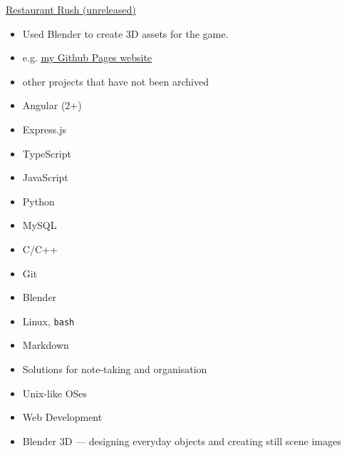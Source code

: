 \documentclass[10pt,a4paper,ragged2e,withhyper]{altacv}
\begin{document}
\begin{paracol}{2}
\divider

\switchcolumn

\vspace{32pt}

\divider

\small\href{https://github.com/Qarian/Restaurant-rush}{Restaurant Rush (unreleased)}
\smallskip

\begin{itemize}
    \item Used Blender to create 3D assets for the game.
\end{itemize}

\divider

\begin{itemize}
    \item e.g. \href{https://jerry-sky.github.io}{my Github Pages website}
    \item other projects that have not been archived
\end{itemize}



\begin{itemize}
\item Angular (2+)
\item Express.js
\item TypeScript
\item JavaScript
\item Python
\item MySQL
\item C/C++
\item Git
\item Blender
\item Linux, \texttt{bash}
\item Markdown
\end{itemize}


\begin{itemize}
  \item Solutions for note-taking and organisation
  \item Unix-like OSes
  \item Web Development
  \item Blender 3D — designing everyday objects and creating still scene images
\end{itemize}





\end{paracol}
\end{document}
